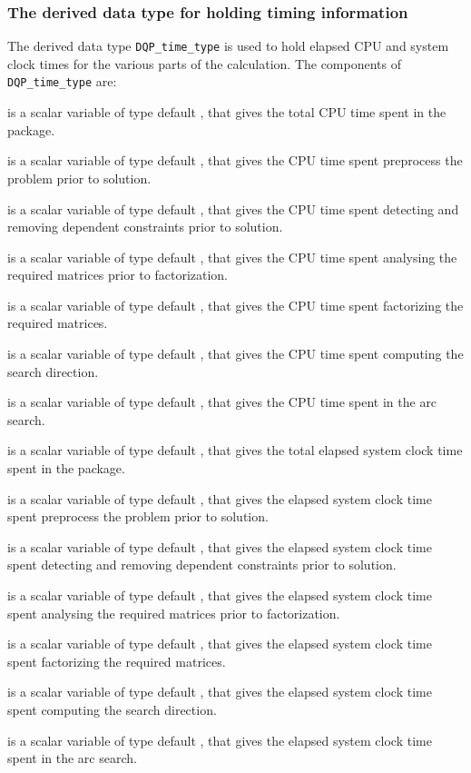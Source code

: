 \documentclass{galahad}
\newcommand{\packagename}{DQP}
\begin{document}
\subsubsection{The derived data type for holding timing
 information}\label{typetime}
The derived data type
{\tt \packagename\_time\_type}
is used to hold elapsed CPU and system clock times for the various parts of
the calculation. The components of
{\tt \packagename\_time\_type}
are:
\begin{description}
 is a scalar variable of type default \realdp, that gives
 the total CPU time spent in the package.

 is a scalar variable of type default \realdp, that gives
 the CPU time spent preprocess the problem prior to solution.

 is a scalar variable of type default \realdp, that gives
 the CPU time spent detecting and removing dependent constraints prior
to solution.

 is a scalar variable of type default \realdp, that gives
 the CPU time spent analysing the required matrices prior to factorization.

 is a scalar variable of type default \realdp, that gives
 the CPU time spent factorizing the required matrices.

 is a scalar variable of type default \realdp, that gives
 the CPU time spent computing the search direction.

 is a scalar variable of type default \realdp, that gives
 the CPU time spent in the arc search.

 is a scalar variable of type default \realdp, that gives
 the total elapsed system clock time spent in the package.

 is a scalar variable of type default \realdp, that gives
 the elapsed system clock time spent preprocess the problem prior to solution.

 is a scalar variable of type default \realdp,
that gives  the elapsed system clock time spent detecting and removing
dependent constraints prior to solution.

 is a scalar variable of type default \realdp, that gives
 the elapsed system clock time spent analysing the required matrices prior to
factorization.

 is a scalar variable of type default \realdp, that gives
 the elapsed system clock time spent factorizing the required matrices.

 is a scalar variable of type default \realdp, that gives
 the elapsed system clock time spent computing the search direction.

 is a scalar variable of type default \realdp, that gives
 the elapsed system clock time spent in the arc search.

\end{description}
\end{document}

